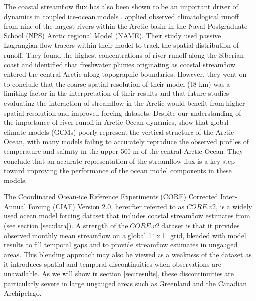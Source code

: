 \documentclass[jgrga, draft]{agutex}
\begin{document}
\begin{article}
The coastal streamflow flux has also been shown to be an important driver of dynamics in coupled ice-ocean models \citep[e.g.][]{Morison_2012,Lique_2015,Large_2009}.
\citet{Newton_2008} applied observed climatological runoff from nine of the largest rivers within the Arctic basin in the Naval Postgraduate School (NPS) Arctic regional Model (NAME).
Their study used passive Lagrangian flow tracers within their model to track the spatial distribution of runoff.
They found the highest concentrations of river runoff along the Siberian coast and identified that freshwater plumes originating as coastal streamflow entered the central Arctic along topographic boundaries.
However, they went on to conclude that the coarse spatial resolution of their model (18 km) was a limiting factor in the interpretation of their results and that future studies evaluating the interaction of streamflow in the Arctic would benefit from higher spatial resolution and improved forcing datasets.
Despite our understanding of the importance of river runoff in Arctic Ocean dynamics, \citet{Nummelin_2015} show that global climate models (GCMs) poorly represent the vertical structure of the Arctic Ocean, with many models failing to accurately reproduce the observed profiles of temperature and salinity in the upper 500 m of the central Arctic Ocean.
They conclude that an accurate representation of the streamflow flux is a key step toward improving the performance of the ocean model components in these models.

The Coordinated Ocean-ice Reference Experiments (CORE) Corrected Inter-Annual Forcing (CIAF) Version 2.0, hereafter referred to as $CORE.v2$, is a widely used ocean model forcing dataset that includes coastal streamflow estimates from \citet{Dai_2009} (see section \ref{sec:data}).
A strength of the $CORE.v2$ dataset is that it provides observed monthly mean streamflow on a global 1$^{\circ}$ x 1$^{\circ}$ grid, blended with model results to fill temporal gaps and to provide streamflow estimates in ungauged areas.
This blending approach may also be viewed as a weakness of the dataset as it introduces spatial and temporal discontinuities when observations are unavailable.
As we will show in section \ref{sec:results}, these discontinuities are particularly severe in large ungauged areas such as Greenland and the Canadian Archipelago.


\end{article}
\end{document}
